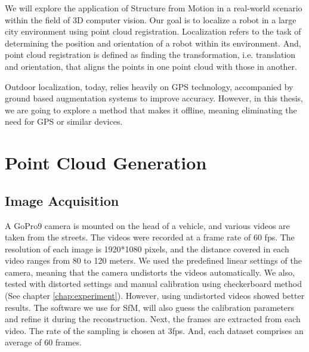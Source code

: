 \documentclass[11pt]{article}
\begin{document}
    We will explore the application of Structure from Motion in a real-world scenario within the field of 3D
    computer vision. Our goal is to localize a robot in a large city environment using point cloud registration.
    Localization refers to the task of determining the position and orientation of a robot within its environment.
    And, point cloud registration is defined as finding the transformation, i.e. translation and orientation,
    that aligns the points in one point cloud with those in another.

    Outdoor localization, today, relies heavily on GPS technology, accompanied by ground based augmentation systems
    to improve accuracy. However, in this thesis, we are going to explore a method that makes it offline, meaning
    eliminating the need for GPS or similar devices.

    \section{Point Cloud Generation}
    \subsection{Image Acquisition}
    A GoPro9 camera is mounted on the head of a vehicle, and various videos are taken from the streets.
    The videos were recorded at a frame rate of 60 fps. The resolution of each image is 1920*1080 pixels,
    and the distance covered in each video ranges from 80 to 120 meters. We used the predefined linear settings of the camera,
    meaning that the camera undistorts the videos automatically. We also, tested with distorted settings and manual calibration using checkerboard method
    (See chapter \ref{chap:experiment}). However, using undistorted videos showed better results. The software
    we use for SfM, will also guess the calibration parameters and refine it during the reconstruction. Next, the frames are extracted from each video.
    The rate of the sampling is chosen at 3fps. And, each dataset comprises an average of 60 frames.
\end{document}
